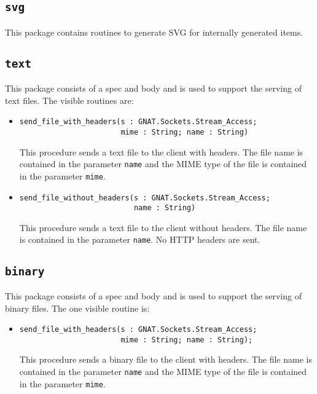 \documentclass[10pt, openany, draft]{article}
\begin{document}
\subsection{\texttt{svg}}
This package contains routines to generate SVG for internally generated items.

\subsection{\texttt{text}}
This package consists of a spec and body and is used to support the serving of text files.  The visible routines are:
\begin{itemize}
  \item \begin{verbatim}send_file_with_headers(s : GNAT.Sockets.Stream_Access;
                       mime : String; name : String)
  \end{verbatim}
  This procedure sends a text file to the client with headers.  The file name is contained in the parameter \texttt{name} and the MIME type of the file is contained in the parameter \texttt{mime}.

  \item \begin{verbatim}send_file_without_headers(s : GNAT.Sockets.Stream_Access;
                          name : String)
  \end{verbatim}
  This procedure sends a text file to the client without headers.  The file name is contained in the parameter \texttt{name}.  No HTTP headers are sent.
\end{itemize}

\subsection{\texttt{binary}}
This package consists of a spec and body and is used to support the serving of binary files.  The one visible routine is:
\begin{itemize}
  \item \begin{verbatim}send_file_with_headers(s : GNAT.Sockets.Stream_Access;
                       mime : String; name : String);
            \end{verbatim}
  This procedure sends a binary file to the client with headers.  The file name is contained in the parameter \texttt{name} and the MIME type of the file is contained in the parameter \texttt{mime}.
\end{itemize}
\end{document}
